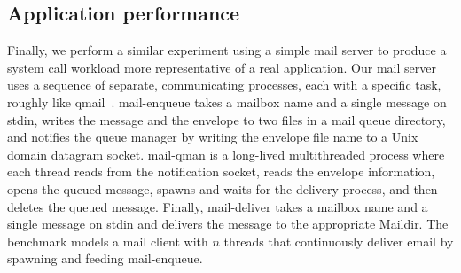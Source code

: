 \begin{comment}
The application could perform the name lookup once by a setting up a
stream socket at the beginning, and then using \code{send} to
communicate.  This setup results in better scalability (see the line
labeled ``Linux with $n$ streams''). But, in this setup, a spin
lock in the scheduler becomes a bottleneck (\XXX[FK]{double check}).
Clearly, Linux developers could remove these bottlenecks.  What is nice
about our approach is that the commutativity rule makes clear that these
locks can be removed and that \tool{} can catch these non-scalable
invocations that should be scalable.  \XXX[FK]{We should mention
somewhere that we have a model for unordered and ordered sockets.}

\begin{figure}
  \centering
  
  \caption{Scalability of $n$ clients concurrently sending and receiving 1
    byte messages to/from $n$ server  processes.}
  \label{fig:sockbench}
\end{figure}
\end{comment}


\subsection{Application performance}
\label{sec:eval:app}


Finally, we perform a similar experiment using a simple mail server to
produce a system call workload more representative of a real
application.  Our mail server uses a sequence of separate, communicating
processes, each with a specific task, roughly like qmail~\cite{qmail}.
{mail-enqueue} takes a mailbox name and a single message on
stdin, writes the message and the envelope to two files in a
mail queue directory, and notifies the queue manager by writing the
envelope file
name to a Unix domain datagram socket.  {mail-qman} is a long-lived
multithreaded process where each thread reads from the notification
socket, reads the envelope information, opens the queued message, spawns
and waits for the delivery process, and then deletes the queued message.
Finally, {mail-deliver} takes a mailbox name and a single message
on stdin and delivers the message to the appropriate Maildir.
The benchmark models a mail client with $n$ threads that continuously
deliver email by spawning and feeding {mail-enqueue}.

